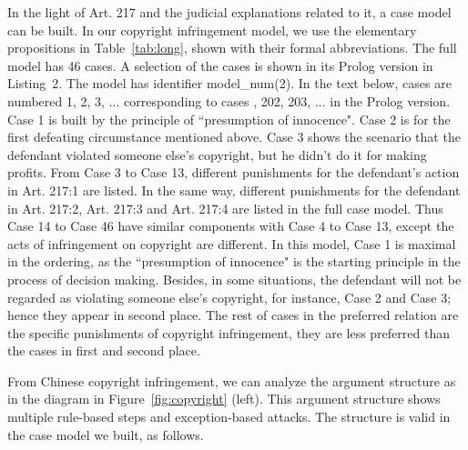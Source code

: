 \documentclass{IOS-Book-Article}
\begin{document}
In the light of Art. 217 and the judicial explanations related to it, a case model can be built. 
In our copyright infringement model, we use the elementary propositions in \mbox{Table}~\ref{tab:long}, shown with their formal abbreviations. 
The full model has 46 cases. A selection of the cases is shown in its Prolog version in Listing~2. The model has identifier {\mf model\_num(2)}. 
In the text below, cases are numbered 1, 2, 3, ... corresponding  to cases {, 202, 203, ...} in the Prolog version.
Case 1 is built by the principle of ``presumption of innocence". Case 2 is for the first defeating circumstance mentioned above. Case 3 shows the scenario that the defendant violated someone else's copyright, but he didn't do it for making profits. From Case 3 to Case 13, different punishments for the defendant's action in Art. 217:1 are listed. In the same way, different punishments for the defendant in Art. 217:2, Art. 217:3 and Art. 217:4 are listed in the full case model. Thus Case 14 to Case 46 have similar components with Case 4 to Case 13, except the acts of infringement on copyright are different. In this model, Case 1 is maximal in the ordering, as the ``presumption of innocence" is the starting principle in the process of decision making. Besides, in some situations, the defendant will not be regarded as violating someone else's copyright, for instance, Case 2 and Case 3; hence they appear in second place. The rest of cases in the preferred relation are the specific punishments of copyright infringement, they are less preferred than the cases in first and second place.

From Chinese copyright infringement, we can analyze the argument structure as in the diagram in Figure~\ref{fig:copyright} (left). This argument structure shows multiple rule-based steps and exception-based attacks. The structure is valid in the case model we built, as follows.
\end{document}
